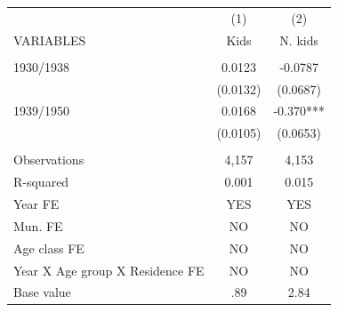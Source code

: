 \begin{tabular}{lcc} \hline
 & (1) & (2) \\
VARIABLES & Kids & N. kids \\ \hline
 &  &  \\
1930/1938 & 0.0123 & -0.0787 \\
 & (0.0132) & (0.0687) \\
1939/1950 & 0.0168 & -0.370*** \\
 & (0.0105) & (0.0653) \\
 &  &  \\
Observations & 4,157 & 4,153 \\
R-squared & 0.001 & 0.015 \\
Year FE & YES & YES \\
Mun. FE & NO & NO \\
Age class FE & NO & NO \\
Year X Age group X Residence FE & NO & NO \\
 Base value & .89 & 2.84 \\ \hline
\end{tabular}
